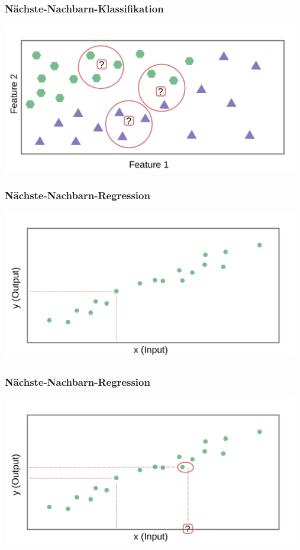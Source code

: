 \documentclass[aspectratio=169]{beamer}
\begin{document}
\begin{frame}
  \frametitle{Nächste-Nachbarn-Klassifikation}
  \begin{center}
    \includegraphics[width=13.0cm]{images/k_nearest_neighbour_classification_k_3.pdf}
  \end{center}
\end{frame}

\begin{frame}
  \frametitle{Nächste-Nachbarn-Regression}
  \begin{center}
    \includegraphics[width=13.0cm]{images/k_nearest_neighbour_regression_only_training_data.pdf}
  \end{center}
\end{frame}

\begin{frame}
  \frametitle{Nächste-Nachbarn-Regression}
  \begin{center}
    \includegraphics[width=13.0cm]{images/k_nearest_neighbour_regression_k_1.pdf}    
  \end{center}
\end{frame}
\end{document}
